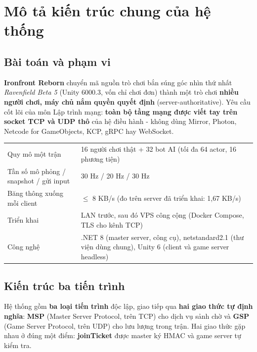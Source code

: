 
\section{Mô tả kiến trúc chung của hệ thống}

\subsection{Bài toán và phạm vi}
\textbf{Ironfront Reborn} chuyển mã nguồn trò chơi bắn súng góc nhìn thứ nhất \textit{Ravenfield Beta 5}
(Unity 6000.3, vốn chỉ chơi đơn) thành một trò chơi \textbf{nhiều người chơi, máy chủ nắm quyền quyết định}
(server-authoritative). Yêu cầu cốt lõi của môn Lập trình mạng: \textbf{toàn bộ tầng mạng được viết tay trên
socket TCP và UDP thô} của hệ điều hành - không dùng Mirror, Photon, Netcode for GameObjects,
KCP, gRPC hay WebSocket.

\begin{center}\small
\begin{tabularx}{\linewidth}{|L{5.2cm}|Y|}
\hline
{} &  \\ \hline
Quy mô một trận & 16 người chơi thật + 32 bot AI (tối đa 64 actor, 16 phương tiện) \\ \hline
Tần số mô phỏng / snapshot / gửi input & 30 Hz / 20 Hz / 30 Hz \\ \hline
Băng thông xuống mỗi client & $\le$ 8 KB/s (đo trên server đã triển khai: 1,67 KB/s) \\ \hline
Triển khai & LAN trước, sau đó VPS công cộng (Docker Compose, TLS cho kênh TCP) \\ \hline
Công nghệ & .NET 8 (master server, công cụ), netstandard2.1 (thư viện dùng chung), Unity 6 (client và game server headless) \\ \hline
\end{tabularx}
\end{center}

\subsection{Kiến trúc ba tiến trình}
Hệ thống gồm \textbf{ba loại tiến trình} độc lập, giao tiếp qua \textbf{hai giao thức tự định nghĩa}:
\textbf{MSP} (Master Server Protocol, trên TCP) cho dịch vụ sảnh chờ và \textbf{GSP} (Game Server Protocol,
trên UDP) cho lưu lượng trong trận. Hai giao thức gặp nhau ở đúng một điểm: \textbf{joinTicket} được master
ký HMAC và game server tự kiểm tra.

